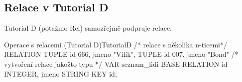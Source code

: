 \subsection{Relace v Tutorial D}
Tutorial D (potažmo Rel) samozřejmě podpruje relace.
\begin{upcode}{Operace s relacemi (Tutorial D)}{}{TutorialD}
/* relace s několika n-ticemi*/
RELATION {
	TUPLE {id 666, jmeno "Vilík"},
	TUPLE {id 007, jmeno "Bond"}
}
/* vytvoření relace jakožto typu */
VAR seznam_lidi BASE RELATION {id INTEGER, jmeno STRING} KEY {id};
\end{upcode}